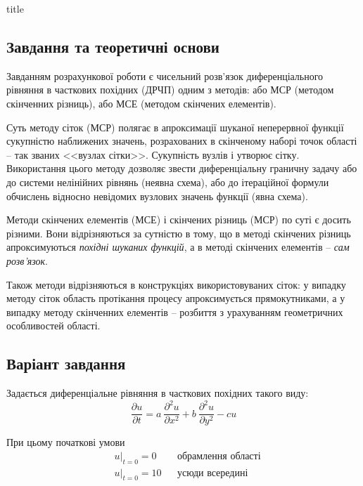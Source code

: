 \documentclass[a4paper,14pt]{extarticle} %
\begin{document}
{title}

\tableofcontents

\newpage

\subsection*{Завдання та теоретичні основи}

Завданням розрахункової роботи є чисельний розв'язок диференціального рівняння в часткових похідних (ДРЧП) одним
з методів: або МСР (методом скінченних різниць), або МСЕ (методом скінчених елементів).

Суть методу сіток (МСР) полягає в апроксимації шуканої неперервної функції сукупністю наближених значень, 
розрахованих в скінченому наборі точок області -- так званих <<вузлах сітки>>. Сукупність вузлів і утворює сітку. 
Використання цього методу дозволяє звести диференціальну граничну задачу або до системи нелінійних рівнянь 
(неявна схема), або до ітераційної формули обчислень відносно невідомих вузлових значень функції (явна схема).

Методи скінчених елементів (МСЕ) і скінчених різниць (МСР) по суті є досить різними. Вони відрізняються за 
сутністю в тому, що в методі скінчених різниць апроксимуються \textit{похідні шуканих функцій}, а в методі
скінчених елементів -- \textit{сам розв’язок}. 

Також методи відрізняються в конструкціях використовуваних сіток: у випадку методу сіток область протікання 
процесу апроксимується прямокутниками, а у випадку методу скінченних елементів -- розбиття з урахуванням 
геометричних особливостей області.

\subsection*{Варіант завдання}

Задається диференціальне рівняння в часткових похідних такого виду:
\begin{equation}
    \frac{\partial u}{\partial t} = a\ \frac{\partial^2 u}{\partial x^2} + b\ \frac{\partial^2 u}{\partial y^2} - cu \label{formula: equation}
\end{equation}

При цьому початкові умови
\begin{align*}
    &\left. u \right|_{t=0}=0 && \text{обрамлення області} \\
    &\left. u \right|_{t=0}=10 && \text{усюди всередині}
\end{align*}
\end{document}
